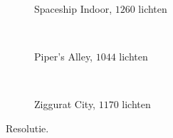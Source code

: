 \begin{figure}[t]
\begin{minipage}[t]{0.5\textwidth}
\begin{adjustbox}{minipage=\textwidth, scale=0.55}
\begin{subfigure}[b]{1.6\textwidth}
      \centering
      \def\svgwidth{\textwidth}
      
      \caption{Spaceship Indoor, $1260$ lichten}
      \vspace{4pt}
      \label{fig:cs-lc-resolution:indoor}
    \end{subfigure}
  \end{adjustbox} \\
  \begin{adjustbox}{minipage=\textwidth, scale=0.55}
    \begin{subfigure}[b]{1.6\textwidth}
      \centering
      \def\svgwidth{\textwidth}
      
      \caption{Piper's Alley, $1044$ lichten}
      \vspace{4pt}
      \label{fig:cs-lc-resolution:alley}
    \end{subfigure}
  \end{adjustbox} \\
  \begin{adjustbox}{minipage=\textwidth, scale=0.55}
    \begin{subfigure}[b]{1.6\textwidth}
      \centering
      \def\svgwidth{\textwidth}
      
      \caption{Ziggurat City, $1170$ lichten}
      \label{fig:cs-lc-resolution:city}
    \end{subfigure}
  \end{adjustbox}
  \caption{\small Resolutie. }
  \label{fig:cs-lc-resolution}
  \end{minipage}
\end{figure}

